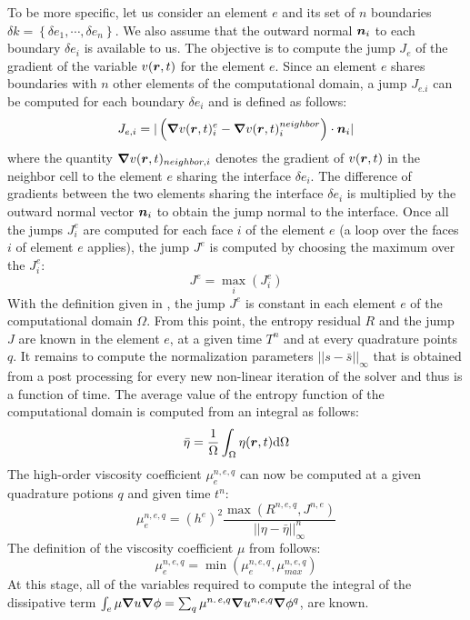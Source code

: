 To be more specific, let us consider an element $e$ and its set of $n$ boundaries $\delta k = \left\{ \delta e_1, \cdots, \delta e_n \right\}$. We also assume that the outward normal $\boldsymbol n_i$ to each boundary $\delta e_i$ is available to us. The objective is to compute the jump $J_e$ of the gradient of the variable $v(\boldsymbol r,t)$ for the element $e$. Since an element $e$ shares boundaries with $n$ other elements of the computational domain, a jump $J_{e.i}$ can be computed for each boundary $\delta e_i$ and is defined as follows:
%
\begin{equation}\label{eq:jump_def_sct2}
J_{e,i} = | \left( \boldsymbol{\nabla} v(\boldsymbol r,t)_{i}^e - \boldsymbol{\nabla} v(\boldsymbol r,t)_{i}^{neighbor} \right) \cdot \boldsymbol n_i |
\end{equation}
% 
where the quantity $\boldsymbol{\nabla} v(\boldsymbol r,t)_{neighbor,i}$ denotes the gradient of $v(\boldsymbol r,t)$ in the neighbor cell to the element $e$ sharing the interface $\delta e_i$. The difference of gradients between the two elements sharing the interface $\delta e_i$ is multiplied by the outward normal vector $\boldsymbol n_i$ to obtain the jump normal to the interface. Once all the jumps $J_{i}^e$ are computed for each face $i$ of the element $e$ (a loop over the faces $i$ of element $e$ applies), the jump $J^e$ is computed by choosing the maximum over the $J_{i}^e$:
%
\begin{equation}\label{eq:jump_def2_sct2}
J^e = \max_i \left( J_{i}^e \right)
\end{equation}
%
With the definition given in , the jump $J^e$ is constant in each element $e$ of the computational domain $\Omega$. From this point, the entropy residual $R$ and the jump $J$ are known in the element $e$, at a given time $T^n$ and at every quadrature points $q$. It remains to compute the normalization parameters $|| s - \bar{s} ||_\infty$ that is obtained from a post processing for every new non-linear iteration of the solver and thus is a function of time. The average value of the entropy function of the computational domain is computed from an integral as follows:
%
\begin{equation}\label{eq:sbar_sct2}
\bar{\eta} = \frac{1}{\Omega} \int_{\Omega} \eta(\boldsymbol r,t) \text{d}\Omega
\end{equation}
%   
The high-order viscosity coefficient $\mu_{e}^{n,e,q}$ can now be computed at a given quadrature potions $q$ and given time $t^n$:
%
\begin{equation}\label{eq:visc_ev2_sct2}
\mu_{e}^{n,e,q} = (h^e)^2 \frac{\max \left( R^{n,e,q}, J^{n,e} \right)}{|| \eta - \bar{\eta} ||_\infty^n}
\end{equation}
%
The definition of the viscosity coefficient $\mu$ from  follows:
%
\begin{equation}\label{eq:visc2_sct2}
\mu_{e}^{n,e,q} = \min \left( \mu_{e}^{n,e,q}, \mu_{max}^{n,e,q} \right)
\end{equation}
%
At this stage, all of the variables required to compute the integral of the dissipative term $\int_{e} \mu \boldsymbol{\nabla} u \boldsymbol{\nabla} \phi = \sum_q \mu^{n.\,e,q} \boldsymbol{\nabla} u^{n,e,q} \boldsymbol{\nabla} \phi^q$, are known.